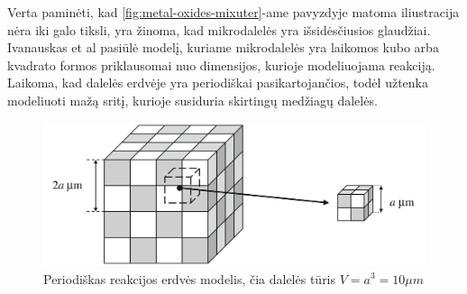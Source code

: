 Verta paminėti, kad \ref{fig:metal-oxides-mixuter}-ame pavyzdyje matoma iliustracija nėra iki galo tiksli, yra žinoma, kad mikrodalelės yra išsidėsčiusios glaudžiai.
\cite{ivanauskasModellingSolidState2005} Ivanauskas et al pasiūlė modelį, kuriame mikrodalelės yra laikomos kubo arba kvadrato formos priklausomai nuo dimensijos, kurioje modeliuojama reakciją. Laikoma, kad dalelės erdvėje yra periodiškai pasikartojančios, todėl užtenka modeliuoti mažą sritį, kurioje susiduria skirtingų medžiagų dalelės. 

\begin{figure}[h]
  \centering
  \includegraphics[width=0.75\linewidth]{assets/periodic-space.png}
  \caption{Periodiškas reakcijos erdvės modelis, čia dalelės tūris $V=a^3=10\mu m$}
  \label{fig:periodic-space}
\end{figure}